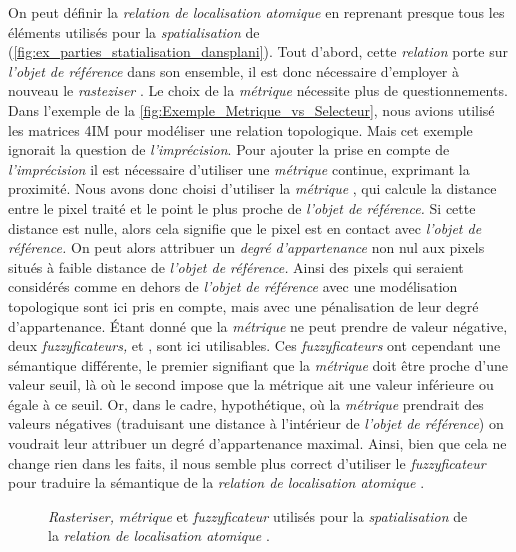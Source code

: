 On peut définir la \emph{relation de localisation atomique}
 en reprenant presque tous les
éléments utilisés pour la \emph{spatialisation} de
(\autoref{fig:ex_parties_statialisation_dansplani}). Tout d'abord,
cette \emph{relation} porte sur \emph{l'objet de référence} dans son
ensemble, il est donc nécessaire d'employer à nouveau le
\emph{rasteziser} . Le choix de la
\emph{métrique} nécessite plus de questionnements.
%
Dans l'exemple de la \autoref{fig:Exemple_Metrique_vs_Selecteur}, nous
avions utilisé les matrices 4IM pour modéliser une relation
topologique. Mais cet exemple ignorait la question de
\emph{l'imprécision}. Pour ajouter la prise en compte de
\emph{l'imprécision} il est nécessaire d'utiliser une \emph{métrique}
continue, exprimant la proximité. Nous avons donc choisi d'utiliser la
\emph{métrique} , qui calcule la distance entre
le pixel traité et le point le plus proche de \emph{l'objet de
  référence.} Si cette distance est nulle, alors cela signifie que le
pixel est en contact avec \emph{l'objet de référence.} On peut alors
attribuer un \emph{degré d'appartenance} non nul aux pixels situés à
faible distance de \emph{l'objet de référence.} Ainsi des pixels qui
seraient considérés comme en dehors de \emph{l'objet de référence}
avec une modélisation topologique sont ici pris en compte, mais avec
une pénalisation de leur degré d'appartenance. Étant donné que la
\emph{métrique}  ne peut prendre de valeur
négative, deux \emph{fuzzyficateurs,}  et
, sont ici utilisables. Ces
\emph{fuzzyficateurs} ont cependant une sémantique différente, le
premier signifiant que la \emph{métrique} doit être proche d'une
valeur seuil, là où le second impose que la métrique ait une valeur
inférieure ou égale à ce seuil. Or, dans le cadre, hypothétique, où la
\emph{métrique}  prendrait des valeurs négatives
(\ie traduisant une distance à l'intérieur de \emph{l'objet de
  référence}) on voudrait leur attribuer un degré d'appartenance
maximal. Ainsi, bien que cela ne change rien dans les faits, il nous
semble plus correct d'utiliser le \emph{fuzzyficateur}
 pour traduire la sémantique de la \emph{relation
  de localisation atomique} .

\begin{figure}
  \centering
  
  \caption{\emph{Rasteriser,} \emph{métrique} et \emph{fuzzyficateur}
    utilisés pour la \emph{spatialisation} de la \emph{relation de
      localisation atomique}
    \protect{}.}
  \label{fig:ex_parties_statialisation_dansplani}
\end{figure}

